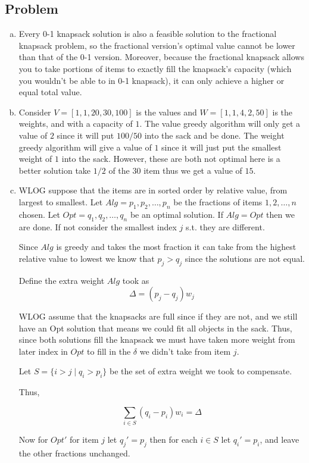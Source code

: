 \documentclass[12pt, letterpaper]{article}
\theoremstyle{definition}
\newcounter{problem}
\newcommand{\q}{
    \newpage %
    \stepcounter{problem} %
    \subsection*{Problem \arabic{problem}} %
}
\begin{document}
\q
\begin{enumerate}[(a)]
    \item Every 0-1 knapsack solution is also a feasible solution to the fractional knapsack problem, so the fractional version's optimal value cannot be lower than that of the 0-1 version. Moreover, because the fractional knapsack allows you to take portions of items to exactly fill the knapsack's capacity (which you wouldn't be able to in 0-1 knapsack), it can only achieve a higher or equal total value.
    
    \item Consider $V=[1,1,20,30,100]$ is the values and $W=[1,1,4,2,50]$ is the weights, and with a capacity of $1$. The value greedy algorithm will only get a value of $2$ since it will put $100/50$ into the sack and be done. The weight greedy algorithm will give a value of $1$ since it will just put the smallest weight of $1$ into the sack. However, these are both not optimal here is a better solution take $1/2$ of the $30$ item thus we get a value of $15$.
    
    \item WLOG suppose that the items are in sorted order by relative value, from largest to smallest. Let $Alg=p_1,p_2,\dots,p_n$ be the fractions of items $1,2,\dots,n$ chosen. Let $Opt=q_1,q_2,\dots,q_n$ be an optimal solution. If $Alg=Opt$ then we are done. If not consider the smallest index $j$ s.t. they are different.
    
    Since $Alg$ is greedy and takes the most fraction it can take from the highest relative value to lowest we know that $p_j > q_j$ since the solutions are not equal.

    Define the extra weight $Alg$ took as
    \[\Delta=(p_j-q_j)w_j\]

    WLOG assume that the knapsacks are full since if they are not, and we still have an Opt solution that means we could fit all objects in the sack. Thus, since both solutions fill the knapsack we must have taken more weight from later index in $Opt$ to fill in the $\delta$ we didn't take from item $j$.

    Let $S=\{i > j \mid q_i > p_i\}$ be the set of extra weight we took to compensate.

    Thus,

    \[\sum_{i \in S}(q_i-p_i)w_i=\Delta\]

    Now for $Opt'$ for item $j$ let $q_j'=p_j$ then for each $i \in S$ let $q_i'=p_i$, and leave the other fractions unchanged.


\end{enumerate}
\end{document}
